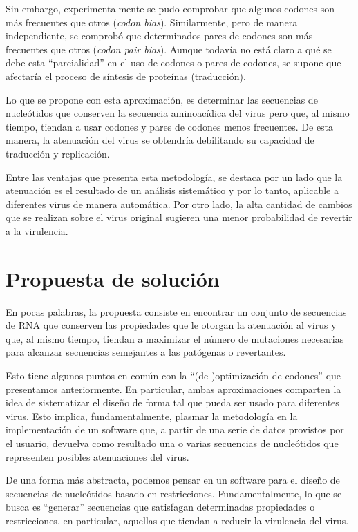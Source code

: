 Sin embargo, experimentalmente se pudo comprobar que algunos codones son m\'as
frecuentes que otros (\textit{codon bias}). Similarmente, pero de manera
independiente, se comprob\'o que determinados pares de codones son m\'as
frecuentes que otros (\textit{codon pair bias}). Aunque todav\'ia no est\'a
claro a qu\'e se debe esta ``parcialidad'' en el uso de codones o pares de
codones, se supone que afectar\'ia el proceso de s\'intesis de prote\'inas
(traducci\'on). 

Lo que se propone con esta aproximaci\'on, es determinar las secuencias de
nucle\'otidos que conserven la secuencia aminoac\'idica del virus pero que, al
mismo tiempo, tiendan a usar codones y pares de codones menos frecuentes. De
esta manera, la atenuaci\'on del virus se obtendr\'ia debilitando su capacidad
de traducci\'on y replicaci\'on. 

Entre las ventajas que presenta esta metodolog\'ia, se destaca por un lado que
la atenuaci\'on es el resultado de un an\'alisis sistem\'atico y por lo tanto,
aplicable a diferentes virus de manera autom\'atica. Por otro lado, la alta
cantidad de cambios que se realizan sobre el virus original sugieren una menor
probabilidad de revertir a la virulencia.

\section{Propuesta de soluci\'on}
\label{vacunas-propuesta}

En pocas palabras, la propuesta consiste en encontrar un conjunto de secuencias
de \ac{RNA} que conserven las propiedades que le otorgan la atenuaci\'on al
virus y que, al mismo tiempo, tiendan a maximizar el n\'umero de mutaciones
necesarias para alcanzar secuencias semejantes a las pat\'ogenas o revertantes.

Esto tiene algunos puntos en com\'un con la ``(de-)optimizaci\'on de codones''
que presentamos anteriormente. En particular, ambas aproximaciones comparten la
idea de sistematizar el dise\~no de forma tal que pueda ser usado para
diferentes virus. Esto implica, fundamentalmente, plasmar la metodolog\'ia en la
implementaci\'on de un software que, a partir de una serie de datos provistos
por el usuario, devuelva como resultado una o varias secuencias de nucle\'otidos
que representen posibles atenuaciones del virus.

De una forma m\'as abstracta, podemos pensar en un software para el dise\~no de
secuencias de nucle\'otidos basado en restricciones. Fundamentalmente, lo que se
busca es ``generar'' secuencias que satisfagan determinadas propiedades o
restricciones, en particular, aquellas que tiendan a reducir la virulencia del
virus.

